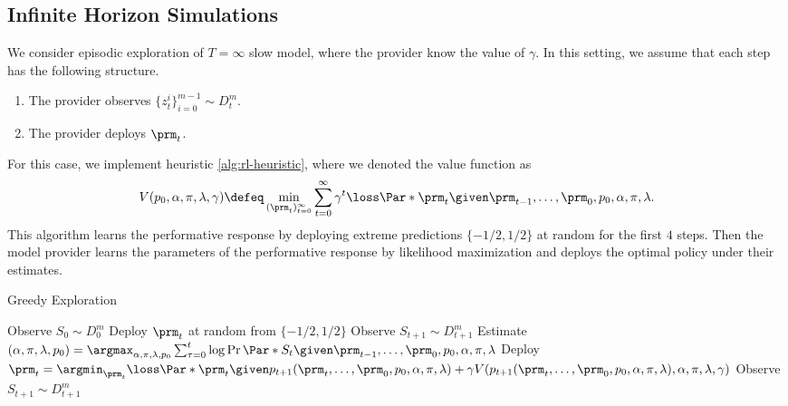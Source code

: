 \subsection{Infinite Horizon Simulations}

We consider episodic exploration of $T=\infty$ slow model, where the provider
know the value of $\gamma$. In this setting, we assume that each step has the
following structure.
\begin{enumerate}
    \item The provider observes $\{z^i_t\}_{i=0}^{m-1} \sim D_t^m$.
    \item The provider deploys $\prm_t$.
\end{enumerate}
For this case, we implement heuristic \cref{alg:rl-heuristic}, where we denoted
the value function as
\[
    V(p_0, \alpha, \pi, \lambda, \gamma) \defeq
    \min_{(\prm_t)_{t=0}^\infty} \sum_{t=0}^\infty \gamma^t \loss\Par*{\prm_t
    \given \prm_{t-1}, \dots, \prm_0, p_0, \alpha, \pi, \lambda}.
\]
This algorithm learns the performative response by deploying extreme
predictions $\{-1/2, 1/2\}$ at random for the first $4$ steps. Then the model
provider learns the parameters of the performative response by likelihood
maximization and deploys the optimal policy under their estimates.
\begin{algorithm}[ht]
    \caption{Greedy Exploration}
    \label{alg:rl-heuristic}
    \begin{algorithmic}
        \STATE Observe $S_0 \sim D_0^m$
            \STATE Deploy $\prm_t$ at random from $\{-1/2, 1/2\}$
            \STATE Observe $S_{t+1} \sim D_{t+1}^m$
        \ENDFOR
            \STATE Estimate $(\alpha, \pi, \lambda, p_0) = \argmax_{\alpha,
            \pi, \lambda, p_0} \sum_{\tau=0}^t \log \Pr\Par*{S_t \given
            \prm_{t-1}, \dots, \prm_0, p_0, \alpha, \pi, \lambda}$
            \STATE Deploy $\prm_t = \argmin_{\prm_t}
            \loss\Par*{\prm_t \given p_{t+1}(\prm_t, \dots, \prm_0, p_0,
            \alpha, \pi, \lambda)} + \gamma V(p_{t+1}(\prm_t, \dots, \prm_0,
            p_0, \alpha, \pi, \lambda), \alpha, \pi, \lambda, \gamma)$
            \STATE Observe $S_{t+1} \sim D_{t+1}^m$
        \ENDFOR
    \end{algorithmic}
\end{algorithm}

\clearpage
